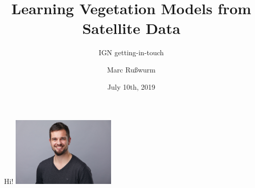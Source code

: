 \documentclass[%
  aspectratio=169,
  9pt,
  USenglish,
  titlegraphic, %
  affiliationintitlepagehead,
  progressbar,
]{beamer}
\title{Learning Vegetation Models from Satellite Data}
\subtitle{IGN getting-in-touch}
\author[M. Rußwurm]{Marc Rußwurm}
\institute[TUM]{Technical University of Munich, Germany\\
                Remote Sensing Technology}
\date{July 10th, 2019}
\begin{document}
\begin{frame}[t]
  \titlepage
\end{frame}


{
	\begin{frame}[plain]
	\vfill
	\begin{center}
		\Huge\color{tumgraydark}
		Hi!
		\hspace{2em}\includegraphics[width=5cm]{images/marc}
	\end{center}
	\vfill
\end{frame}
}
\end{document}

